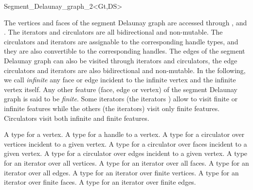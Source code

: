 \begin{ccRefClass}{Segment_Delaunay_graph_2<Gt,DS>}

The vertices and faces of the segment Delaunay graph are
accessed through ,  and . 
The iterators and circulators are all bidirectional and non-mutable.
The circulators and iterators are assignable to the corresponding
handle types, and they are also convertible to the corresponding
handles.
The edges of the segment Delaunay graph can also be visited through
iterators and circulators, the edge circulators and iterators are also
bidirectional and non-mutable.
In the following, we call {\it infinite} any face or edge 
incident  to the infinite vertex and the infinite vertex itself.
Any other feature (face, edge or vertex) of the segment Delaunay graph
is said to be {\it finite}.
Some iterators (the  iterators ) allow to visit finite or 
infinite features while the others (the  iterators) visit only
finite features. Circulators visit both infinite and finite features.

%
%
\ccGlue
{}
{A type for a vertex.}
\ccGlue
{}
\ccGlue
{}
{A type for a handle to a vertex.}
\ccGlue
{}
\ccGlue
{}
{A type for a circulator over vertices incident to a given vertex.}
\ccGlue
{}
{A type for a circulator over faces incident to a given vertex.}
\ccGlue
{}
{A type for a circulator over edges incident to a given vertex.}
\ccGlue
{}
{A type for an iterator over all vertices.}
\ccGlue
{}
{A type for an iterator over all faces.}
\ccGlue
{}
{A type for an iterator over all edges.}
\ccGlue
{}
{A type for an iterator over finite vertices.}
\ccGlue
{}
{A type for an iterator over finite faces.}
\ccGlue
{}
{A type for an iterator over finite edges.}



\end{ccRefClass}
